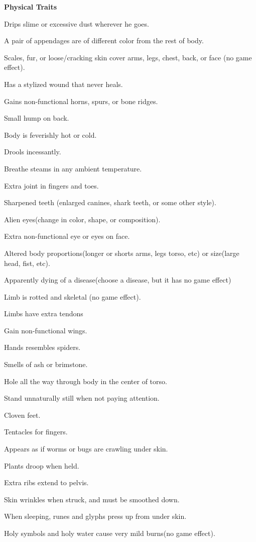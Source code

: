 \begin{multicols}{2}

\begin{description*}
\item \textbf{Physical Traits}
\begin{itemize*}
\item Drips slime or excessive dust wherever he goes.
\item A pair of appendages are of different color from the rest of body.
\item Scales, fur, or loose/cracking skin cover arms, legs, chest, back, or face (no game effect).
\item Has a stylized wound that never heals.
\item Gains non-functional horns, spurs, or bone ridges.
\item Small hump on back.
\item Body is feverishly hot or cold.
\item Drools incessantly.
\item Breathe steams in any ambient temperature.
\item Extra joint in fingers and toes.
\item Sharpened teeth (enlarged canines, shark teeth, or some other style).
\item Alien eyes(change in color, shape, or composition).
\item Extra non-functional eye or eyes on face.
\item Altered body proportions(longer or shorts arms, legs torso, etc) or size(large head, fist, etc).
\item Apparently dying of a disease(choose a disease, but it has no game effect)
\item Limb is rotted and skeletal (no game effect).
\item Limbs have extra tendons
\item Gain non-functional wings.
\item Hands resembles spiders.
\item Smells of ash or brimstone.
\item Hole all the way through body in the center of torso.
\item Stand unnaturally still when not paying attention.
\item Cloven feet.
\item Tentacles for fingers.
\item Appears as if worms or bugs are crawling under skin.
\item Plants droop when held.
\item Extra ribs extend to pelvis.
\item Skin wrinkles when struck, and must be smoothed down.
\item When sleeping, runes and glyphs press up from under skin.
\item Holy symbols and holy water cause very mild burns(no game effect).
\end{itemize*}
\end{description*}


\end{multicols}

